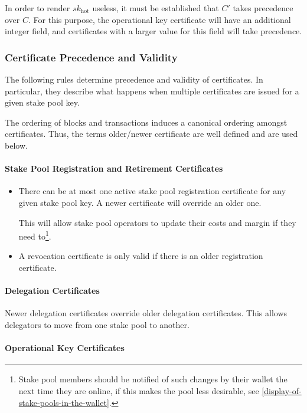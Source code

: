 \documentclass[11pt,a4paper,dvipsnames,twosided]{article}
\begin{document}
In order to render \(sk_\text{hot}\) useless, it must be established
that \(C'\) takes precedence over \(C\). For this purpose, the
operational key certificate will have an additional integer
field, and certificates with a larger value for this field will take
precedence.

\subsubsection{Certificate Precedence and Validity}
\label{certificate-precedence-and-validity}

The following rules determine precedence and validity of certificates.
In particular, they describe what happens when multiple certificates are
issued for a given stake pool key.

The ordering of blocks and transactions induces a canonical ordering
amongst certificates. Thus, the terms older/newer certificate are well
defined and are used below.

\paragraph{Stake Pool Registration and Retirement Certificates}

\begin{itemize}
\item
  There can be at most one active stake pool registration certificate
  for any given stake pool key. A newer certificate will override an older
  one.

  This will allow stake pool operators to update their costs and margin
  if they need to\footnote{Stake pool members should be notified of such changes
  by their wallet the next time they are online, if this makes the pool less
  desirable, see \cref{display-of-stake-pools-in-the-wallet}.}.
\item
  A revocation certificate is only valid if there is an older
  registration certificate.
\end{itemize}

\paragraph{Delegation Certificates}

Newer delegation certificates override older delegation certificates. This
allows delegators to move from one stake pool to another.

\paragraph{Operational Key Certificates}
\end{document}
